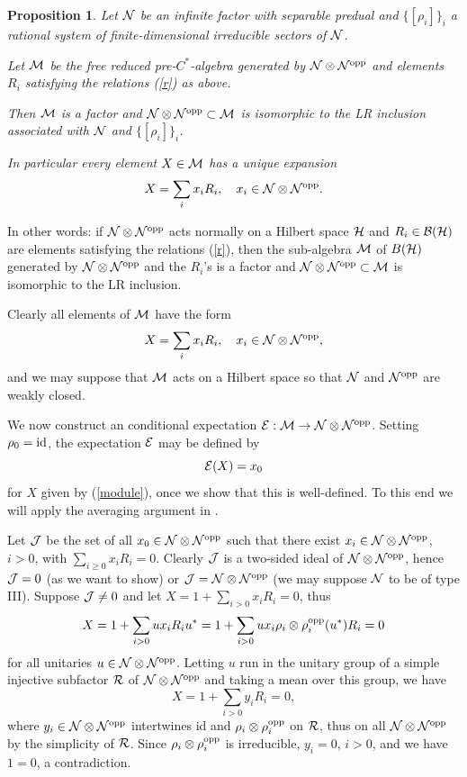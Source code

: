 \documentclass[12pt]{article}
\def\proof{\trivlist \item[\hskip \labelsep{\bf Proof\ }]}
\def\o{{\rm opp}}
\newtheorem{proposition}[theorem]{Proposition}
\def\B{{\cal B}}
\def\J{{\cal J}}
\def\N{{\cal N}}
\def\M{{\cal M}}
\def\E{{\cal E}}
\def\H{{\cal H}}
\begin{document}
\begin{proposition}\label{characterization} 
Let $\N$ be an infinite factor with separable predual and 
$\{[\rho_i]\}_i$ a rational system of finite-dimensional irreducible 
sectors of $\N$.

Let $\M$ be the free reduced pre-$C^*$-algebra generated by $\N\otimes 
\N^\o$ and elements $R_i$ satisfying the relations (\ref{r}) as above.

Then $\M$ is a factor and $\N\otimes \N^\o\subset \M$ is isomorphic to 
the LR inclusion associated with $\N$ and $\{[\rho_i]\}_i$.

In particular every element $X\in\M$ has a unique expansion
\[
X=\sum_i x_iR_i, \quad x_i\in\N\otimes\N^\o.
\]
\end{proposition}
In other words: if $\N\otimes \N^\o$ acts normally on a Hilbert space 
$\H$ and $R_i\in\B(\H)$ are elements satisfying the relations 
(\ref{r}), then the sub-algebra $\M$ of $B(\H)$ generated by 
$\N\otimes \N^\o$ and the $R_i$'s is a factor and $\N\otimes 
\N^\o\subset \M$ is isomorphic to the LR inclusion.
\proof
Clearly all elements of $\M$ have the form
\begin{equation}
        X=\sum_i x_iR_i, \quad x_i\in \N\otimes \N^\o,
        \label{module}
\end{equation}
and we may suppose that $\M$ acts on a Hilbert space so that $\N$ and
$\N^\o$ are weakly closed.

We now construct an conditional expectation $\E : \M\to \N\otimes 
\N^\o$.  Setting $\rho_0 = \textnormal{id}$, the expectation $\E$ may 
be defined by \begin{equation} \E(X)= x_0 \end{equation} for $X$ given 
by (\ref{module}), once we show that this is well-defined.  To this 
end we will apply the averaging argument in \cite{ILP}.

Let $\J$ be the set of all $x_0\in \N\otimes \N^{\o}$ such that
there exist $x_i\in \N\otimes \N^{\o}$, $i>0$, with $\sum_{i\geq 0}
x_i R_i
=0$. Clearly $\J$ is a two-sided ideal of $\N\otimes \N^{\o}$, hence
$\J=0$ (as we want to show) or $\J=\N\otimes \N^{\o}$
(we may suppose $\N$ to be of type III).
Suppose $\J\neq 0$ and let $X=1+\sum_{i> 0}x_i R_i=0$,
thus
$$
X=1+\sum_{i> 0}ux_i R_i u^* =
1+\sum_{i> 0}ux_i \rho_i\otimes\rho_i^\o(u^*)R_i= 0
$$
for all unitaries $u\in \N\otimes \N^{\o}$. Letting $u$ run in the
unitary group of a simple injective subfactor $\cal R$ of  $\N\otimes
\N^{\o}$
and taking a mean over this group, we have
$$
X=1+\sum_{i> 0}y_i R_i  = 0,
$$
where
$y_i\in \N\otimes \N^{\o}$ intertwines id and $\rho_i\otimes\rho_i^\o$
on $\cal R$, thus on all $\N\otimes \N^{\o}$ by the simplicity of
$\cal R$.
Since $\rho_i\otimes\rho_i^\o$ is irreducible, $y_i=0$, $i>0$,
and we have $1=0$, a contradiction.
\end{document}
